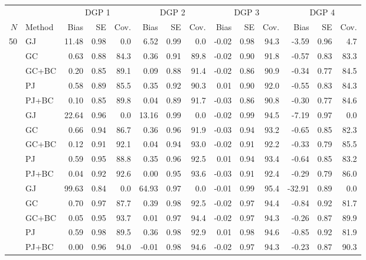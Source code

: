 \begingroup
\normalsize
{}
\setlength{\tabcolsep}{2pt}
\renewcommand{\arraystretch}{0.90}
\begin{tabular}{@{}rl*{4}{rrr}@{}}
\toprule
 & & \multicolumn{3}{c}{DGP 1} & \multicolumn{3}{c}{DGP 2} & \multicolumn{3}{c}{DGP 3} & \multicolumn{3}{c}{DGP 4} \\
\cmidrule(lr){3-5}\cmidrule(lr){6-8}\cmidrule(lr){9-11}\cmidrule(lr){12-14}
\(N\) & Method
 & Bias & SE & Cov.
 & Bias & SE & Cov.
 & Bias & SE & Cov.
 & Bias & SE & Cov. \\
\midrule
50 & GJ & 11.48 & 0.98 & 0.0 & 6.52 & 0.99 & 0.0 & -0.02 & 0.98 & 94.3 & -3.59 & 0.96 & 4.7 \\
 & GC & 0.63 & 0.88 & 84.3 & 0.36 & 0.91 & 89.8 & -0.02 & 0.90 & 91.8 & -0.57 & 0.83 & 83.3 \\
 & GC+BC & 0.20 & 0.85 & 89.1 & 0.09 & 0.88 & 91.4 & -0.02 & 0.86 & 90.9 & -0.34 & 0.77 & 84.5 \\
 & PJ & 0.58 & 0.89 & 85.5 & 0.35 & 0.92 & 90.3 & 0.01 & 0.90 & 92.0 & -0.55 & 0.83 & 84.3 \\
 & PJ+BC & 0.10 & 0.85 & 89.8 & 0.04 & 0.89 & 91.7 & -0.03 & 0.86 & 90.8 & -0.30 & 0.77 & 84.6 \\
\addlinespace[2pt]
100 & GJ & 22.64 & 0.96 & 0.0 & 13.16 & 0.99 & 0.0 & -0.02 & 0.99 & 94.5 & -7.19 & 0.97 & 0.0 \\
 & GC & 0.66 & 0.94 & 86.7 & 0.36 & 0.96 & 91.9 & -0.03 & 0.94 & 93.2 & -0.65 & 0.85 & 82.3 \\
 & GC+BC & 0.12 & 0.91 & 92.1 & 0.04 & 0.94 & 93.0 & -0.02 & 0.91 & 92.2 & -0.33 & 0.79 & 85.5 \\
 & PJ & 0.59 & 0.95 & 88.8 & 0.35 & 0.96 & 92.5 & 0.01 & 0.94 & 93.4 & -0.64 & 0.85 & 83.2 \\
 & PJ+BC & 0.04 & 0.92 & 92.6 & 0.00 & 0.95 & 93.6 & -0.03 & 0.91 & 92.4 & -0.29 & 0.79 & 86.0 \\
\addlinespace[2pt]
500 & GJ & 99.63 & 0.84 & 0.0 & 64.93 & 0.97 & 0.0 & -0.01 & 0.99 & 95.4 & -32.91 & 0.89 & 0.0 \\
 & GC & 0.70 & 0.97 & 87.7 & 0.39 & 0.98 & 92.5 & -0.02 & 0.97 & 94.4 & -0.84 & 0.92 & 81.7 \\
 & GC+BC & 0.05 & 0.95 & 93.7 & 0.01 & 0.97 & 94.4 & -0.02 & 0.97 & 94.3 & -0.26 & 0.87 & 89.9 \\
 & PJ & 0.59 & 0.98 & 89.5 & 0.36 & 0.98 & 92.9 & 0.01 & 0.98 & 94.6 & -0.85 & 0.92 & 81.9 \\
 & PJ+BC & 0.00 & 0.96 & 94.0 & -0.01 & 0.98 & 94.6 & -0.02 & 0.97 & 94.3 & -0.23 & 0.87 & 90.3 \\
\bottomrule
\end{tabular}
\endgroup
